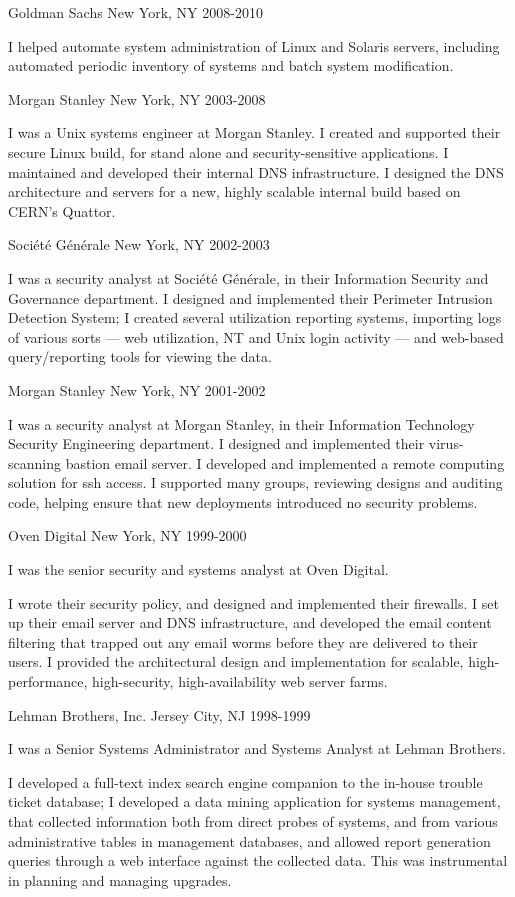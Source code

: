 \documentclass{article}
\begin{document}
Goldman Sachs \hfill New York, NY
2008-2010

I helped automate system administration of Linux and Solaris
servers, including automated periodic inventory of systems
and batch system modification.

Morgan Stanley \hfill New York, NY
2003-2008

I was a Unix systems engineer at Morgan Stanley. I created and
supported their secure Linux build, for stand alone and
security-sensitive applications. I maintained and developed their
internal DNS infrastructure. I designed the DNS architecture
and servers for a new, highly scalable internal build based on
CERN's Quattor.

Soci\'{e}t\'{e} G\'{e}n\'{e}rale \hfill New York, NY
2002-2003

I was a security analyst at Soci\'{e}t\'{e} G\'{e}n\'{e}rale, in their Information
Security and Governance department. I designed and implemented
their Perimeter Intrusion Detection System; I created several
utilization reporting systems, importing logs of various sorts
--- web utilization, NT and Unix login activity --- and web-based
query/reporting tools for viewing the data.

Morgan Stanley \hfill New York, NY
2001-2002

I was a security analyst at Morgan Stanley, in their Information
Technology Security Engineering department. I designed and
implemented their virus-scanning bastion email server. I developed
and implemented a remote computing solution for ssh access. I
supported many groups, reviewing designs and auditing code,
helping ensure that new deployments introduced no security
problems.

Oven Digital \hfill New York, NY
1999-2000

I was the senior security and systems analyst at Oven Digital.

I wrote their security policy, and designed and implemented their
firewalls. I set up their email server and DNS infrastructure,
and developed the email content filtering that trapped out any
email worms before they are delivered to their users. I provided
the architectural design and implementation for scalable,
high-performance, high-security, high-availability web server
farms.

Lehman Brothers, Inc. \hfill Jersey City, NJ
1998-1999

I was a Senior Systems Administrator and Systems Analyst at Lehman
Brothers.

I developed a full-text index search engine companion to
the in-house trouble ticket database; I developed a data
mining application for systems management, that collected
information both from direct probes of systems, and from various
administrative tables in management databases, and allowed report
generation queries through a web interface against the collected
data. This was instrumental in planning and managing upgrades.
\end{document}
